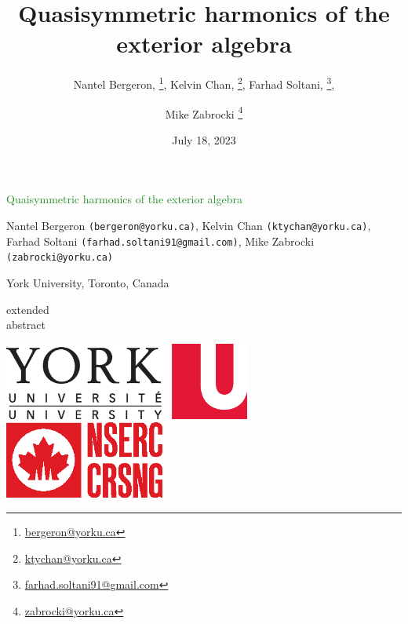 \documentclass[a0,landscape]{a0poster}
\title{Quasisymmetric harmonics of the exterior algebra}
\author{
  Nantel Bergeron, \thanks{\href{mailto:bergeron@yorku.ca}{bergeron@yorku.ca}}, 
  Kelvin Chan, \thanks{\href{mailto:ktychan@yorku.ca}{ktychan@yorku.ca}},
  Farhad Soltani, \thanks{\href{mailto:farhad.soltani91@gmail.com}{farhad.soltani91@gmail.com}}, \and
  Mike Zabrocki \thanks{\href{mailto:zabrocki@yorku.ca}{zabrocki@yorku.ca}}
}
\date{July 18, 2023}
\newcommand{\thetitlecolour}{ForestGreen}
\newcommand{\email}[1]{\texttt{\footnotesize (#1)}}
\begin{document}
%
%
\begin{mdframed}[backgroundcolor=white!0, hidealllines=true]
  \hspace{.1\textwidth}
  \begin{minipage}{.6\textwidth}
    {\veryHuge \textcolor{\thetitlecolour}{Quaisymmetric harmonics of the exterior algebra}}
    \medskip

    {Nantel Bergeron \email{bergeron@yorku.ca}, Kelvin Chan \email{\footnotesize ktychan@yorku.ca}, Farhad Soltani \email{farhad.soltani91@gmail.com}, Mike Zabrocki \email{zabrocki@yorku.ca}} 

    {York University, Toronto, Canada} 
  \end{minipage}
  \quad
  \begin{minipage}{2in}
    \centering
    \bigskip

    {\footnotesize extended\\\vspace{-0.5em}abstract}
  \end{minipage}
  \quad
  \quad
  \begin{minipage}{.2\textwidth}
    \includegraphics[height=1in]{logo_york.eps} \hspace{2em}
    \includegraphics[height=1in]{logo_nserc.eps}\hspace{2em}
  \end{minipage}
\end{mdframed}
\end{document}
